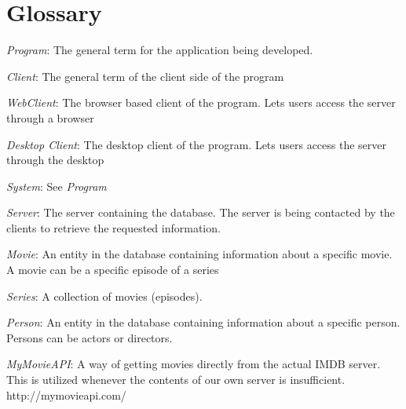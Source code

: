 \section{Glossary}
\label{sec:glossary}

\emph{Program}: The general term for the application being developed.

\emph{Client}: The general term of the client side of the program

\emph{WebClient}: The browser based client of the program. Lets users access the server through a browser

\emph{Desktop Client}: The desktop client of the program. Lets users access the server through the desktop

\emph{System}: See \emph{Program}

\emph{Server}: The server containing the database. The server is being contacted by the clients to retrieve the requested information.

\emph{Movie}: An entity in the database containing information about a specific movie. A movie can be a specific episode of a series

\emph{Series}: A collection of movies (episodes).

\emph{Person}: An entity in the database containing information about a specific person. Persons can be actors or directors.

\emph{MyMovieAPI}: A way of getting movies directly from the actual IMDB server. This is utilized whenever the contents of our own server is insufficient. 
\\http://mymovieapi.com/
